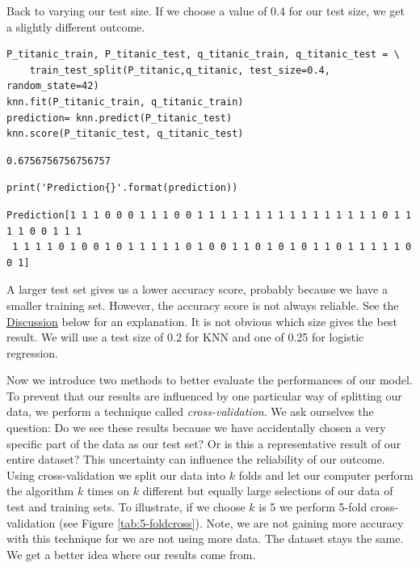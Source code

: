 \documentclass[11pt]{article}
\begin{document}
Back to varying our test size. If we choose a value of 0.4 for our test size, we get a slightly different outcome.

\begin{verbatim}
P_titanic_train, P_titanic_test, q_titanic_train, q_titanic_test = \
    train_test_split(P_titanic,q_titanic, test_size=0.4, random_state=42)
knn.fit(P_titanic_train, q_titanic_train)
prediction= knn.predict(P_titanic_test)
knn.score(P_titanic_test, q_titanic_test)

\end{verbatim}

\begin{verbatim}
0.6756756756756757
\end{verbatim}

\begin{verbatim}
print('Prediction{}'.format(prediction))
\end{verbatim}

\begin{verbatim}
Prediction[1 1 1 0 0 0 1 1 1 0 0 1 1 1 1 1 1 1 1 1 1 1 1 1 1 1 1 0 1 1 1 1 0 0 1 1 1
 1 1 1 1 0 1 0 0 1 0 1 1 1 1 1 0 1 0 0 1 1 0 1 0 1 0 1 1 0 1 1 1 1 1 0 0 1]

\end{verbatim}


A larger test set gives us a lower accuracy score, probably because we have a smaller training set. However, the accuracy score is not always reliable. See the \hyperref[sec:discussion]{Discussion} below for an explanation. It is not obvious which size gives the best result. We will use a test size of 0.2 for KNN and one of 0.25 for logistic regression. 

Now we introduce two methods to better evaluate the performances of our model. To prevent that our results are influenced by one particular way of splitting our data, we perform a technique called \emph{cross-validation}. We ask ourselves the question: Do we see these results because we have accidentally chosen a very specific part of the data as our test set? Or is this a representative result of our entire dataset? This uncertainty can influence the reliability of our outcome. Using cross-validation we split our data into \(k\) folds and let our computer perform the algorithm \(k\) times on \(k\) different but equally large selections of our data of test and training sets. To illustrate, if we choose \(k\) is 5 we perform 5-fold cross-validation (see Figure \ref{tab:5-foldcross}). Note, we are not gaining more accuracy with this technique for we are not using more data. The dataset stays the same. We get a better idea where our results come from. 
\end{document}
